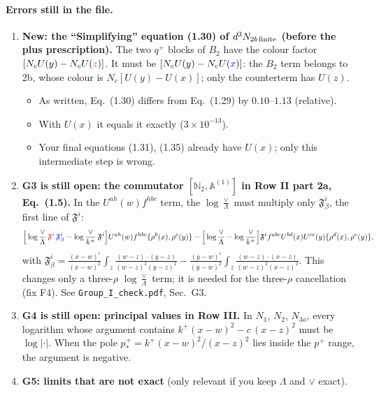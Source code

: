 \documentclass[10pt]{article}
\numberwithin{equation}{section}
\newcommand{\new}[1]{{\color{blue}#1}}
\newcommand{\old}[1]{{\color{red}#1}}
\def\mf#1{\mathbb{#1}}
\begin{document}
\paragraph{Errors still in the file.}
\begin{enumerate}
\item[\textbf{R1}] \textbf{New: the ``Simplifying'' equation (1.30) of $d^3N_{2b\,\rm finite}$ (before the plus prescription).} The two $q^+$ blocks of $B_2$ have the colour factor $[N_cU(y)-N_cU(\old{z})]$. It must be $[N_cU(y)-N_cU(\new{x})]$: the $B_2$ term belongs to 2b, whose colour is $N_c[U(y)-U(x)]$; only the counterterm has $U(z)$.
\begin{itemize}
\item As written, Eq.~(1.30) differs from Eq.~(1.29) by $0.10$--$1.13$ (relative).
\item With $U(x)$ it equals it exactly ($3\times10^{-13}$).
\item Your final equations (1.31), (1.35) already have $U(x)$; only this intermediate step is wrong.
\end{itemize}
\item[\textbf{R2}] \textbf{G3 is still open: the commutator $[\mf N_2,\mf A^{(1)}]$ in Row II part 2a, Eq.~(1.5).} In the $U^{ah}(w)f^{hbc}$ term, the $\log\frac{\vee}{\Lambda}$ must multiply only $\mathfrak F^i_\beta$, the first line of $\mathfrak F^i$:
\begin{equation*}
\Big[\log\frac{\vee}{\Lambda}\,\old{\mathfrak F^i}\,\new{\mathfrak F^i_\beta}-\log\frac{\vee}{k^+}\,\mathfrak F^i\Big]U^{ah}(w)f^{hbc}\{\rho^b(x),\rho^c(y)\}-\Big[\log\frac{\vee}{\Lambda}-\log\frac{\vee}{k^+}\Big]\mathfrak F^i f^{abc}U^{bd}(x)U^{ce}(y)\{\rho^d(x),\rho^e(y)\},
\end{equation*}
with $\mathfrak F^i_\beta=\frac{(x-w)^i}{(x-w)^2}\int_z\frac{(w-z)\cdot(y-z)}{(w-z)^2(y-z)^2}-\frac{(y-w)^i}{(y-w)^2}\int_z\frac{(w-z)\cdot(x-z)}{(w-z)^2(x-z)^2}$. This changes only a three-$\rho$ $\log\frac{\vee}{\Lambda}$ term; it is needed for the three-$\rho$ cancellation (fix F4). See \texttt{Group\_I\_check.pdf}, Sec.~G3.
\item[\textbf{R3}] \textbf{G4 is still open: principal values in Row III.} In $N_1$, $N_2$, $N_{3a}$, every logarithm whose argument contains $k^+(x-w)^2-c\,(x-z)^2$ must be $\log|\cdot|$. When the pole $p^+_*=k^+(x-w)^2/(x-z)^2$ lies inside the $p^+$ range, the argument is negative.
\item[\textbf{R4}] \textbf{G5: limits that are not exact} (only relevant if you keep $\Lambda$ and $\vee$ exact).

\end{enumerate}
\end{document}
